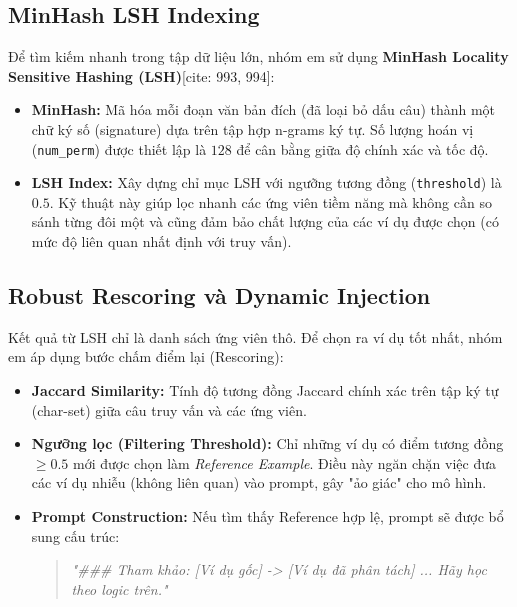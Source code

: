 \subsection{MinHash LSH Indexing}
Để tìm kiếm nhanh trong tập dữ liệu lớn, nhóm em sử dụng \textbf{MinHash Locality Sensitive Hashing (LSH)}[cite: 993, 994]:
\begin{itemize}
    \item \textbf{MinHash:} Mã hóa mỗi đoạn văn bản đích (đã loại bỏ dấu câu) thành một chữ ký số (signature) dựa trên tập hợp n-grams ký tự. Số lượng hoán vị (\texttt{num\_perm}) được thiết lập là $128$ để cân bằng giữa độ chính xác và tốc độ.
    \item \textbf{LSH Index:} Xây dựng chỉ mục LSH với ngưỡng tương đồng (\texttt{threshold}) là $0.5$. Kỹ thuật này giúp lọc nhanh các ứng viên tiềm năng mà không cần so sánh từng đôi một và cũng đảm bảo chất lượng của các ví dụ được chọn (có mức độ liên quan nhất định với truy vấn).
\end{itemize}

\subsection{Robust Rescoring và Dynamic Injection}
Kết quả từ LSH chỉ là danh sách ứng viên thô. Để chọn ra ví dụ tốt nhất, nhóm em áp dụng bước chấm điểm lại (Rescoring):
\begin{itemize}
    \item \textbf{Jaccard Similarity:} Tính độ tương đồng Jaccard chính xác trên tập ký tự (char-set) giữa câu truy vấn và các ứng viên.
    \item \textbf{Ngưỡng lọc (Filtering Threshold):} Chỉ những ví dụ có điểm tương đồng $\ge 0.5$ mới được chọn làm \textit{Reference Example}. Điều này ngăn chặn việc đưa các ví dụ nhiễu (không liên quan) vào prompt, gây "ảo giác" cho mô hình.
    \item \textbf{Prompt Construction:} Nếu tìm thấy Reference hợp lệ, prompt sẽ được bổ sung cấu trúc:
    \begin{quote}
    \textit{"### Tham khảo: [Ví dụ gốc] -> [Ví dụ đã phân tách] ... Hãy học theo logic trên."}
    \end{quote}
\end{itemize}